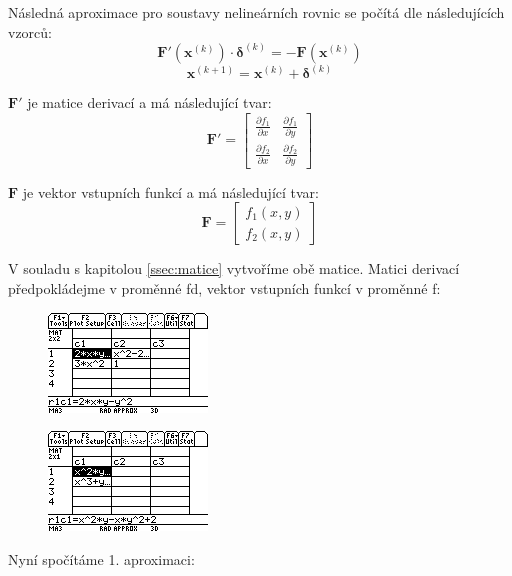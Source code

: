 \documentclass[10pt,a4paper,float]{article}
\begin{document}
Následná aproximace pro soustavy nelineárních rovnic se počítá dle následujících vzorců:
\[
	\mathbf{F'}(\mathbf{x}^{(k)}) \cdot \boldsymbol{\delta}^{(k)} = - \mathbf{F}(\mathbf{x}^{(k)})
\]
\[
	\mathbf{x}^{(k + 1)} = \mathbf{x}^{(k)} + \boldsymbol{\delta}^{(k)}
\]

$\mathbf{F'}$ je matice derivací a má následující tvar:
\[
	\mathbf{F'} =
	\begin{bmatrix}
		\frac{\partial f_1}{\partial x} & \frac{\partial f_1}{\partial y} \\
		\frac{\partial f_2}{\partial x} & \frac{\partial f_2}{\partial y}
	\end{bmatrix}
\]

$\mathbf{F}$ je vektor vstupních funkcí a má následující tvar:
\[
	\mathbf{F} = 
	\begin{bmatrix}
		f_1(x,y)\\
		f_2(x,y)
	\end{bmatrix}
\]

V souladu s kapitolou \ref{ssec:matice} vytvoříme obě matice. Matici derivací předpokládejme v proměnné fd, vektor vstupních funkcí v proměnné f:

\begin{figure}[H]
	\centering
	\includegraphics[width=.5\textwidth]{img/2NEWTON3.PNG}
\end{figure}

\begin{figure}[H]
	\centering
	\includegraphics[width=.5\textwidth]{img/2NEWTON4.PNG}
\end{figure}

\pagebreak

Nyní spočítáme 1. aproximaci:
\end{document}
